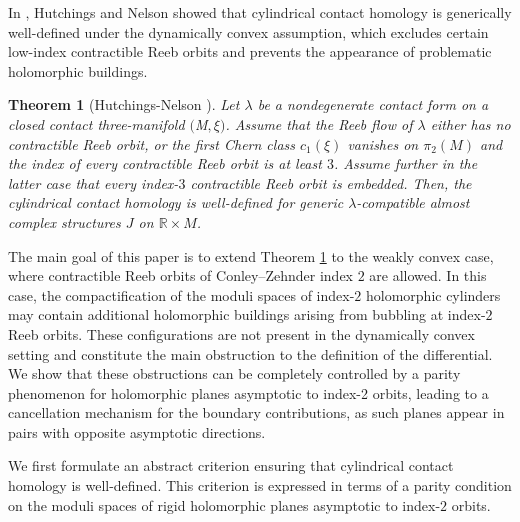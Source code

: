\documentclass{amsart}
\newcommand{\R}{\mathbb{R}}
\newtheorem{theorem}{Theorem}[section]
\begin{document}
In \cite{HN}, Hutchings and Nelson showed that cylindrical contact homology is generically well-defined under the dynamically convex
assumption, which excludes certain low-index contractible Reeb orbits
and prevents the appearance of problematic holomorphic buildings.


\begin{theorem}[Hutchings-Nelson \cite{HN}]\label{thm:HN} Let $\lambda$ be a  nondegenerate contact form on a closed contact three-manifold $($M$,\xi)$. Assume that the Reeb flow of $\lambda$ either has no contractible Reeb orbit, or the first Chern class $c_1(\xi)$ vanishes on $\pi_2(M)$ and the index of every contractible Reeb orbit is at least $3$. Assume further in the latter case that every index-$3$ contractible Reeb orbit is embedded.  
Then, the cylindrical contact homology is well-defined for generic $\lambda$-compatible almost complex structures $J$ on $\R \times M$. 
\end{theorem}


The main goal of this paper is to extend Theorem \ref{thm:HN} to the weakly convex
case, where contractible Reeb orbits of Conley–Zehnder index $2$ are allowed.
In this case, the compactification of the moduli spaces of index-$2$
holomorphic cylinders may contain additional holomorphic buildings arising
from bubbling at index-$2$ Reeb orbits. These configurations are not present
in the dynamically convex setting and constitute the main obstruction to
the definition of the differential. We show that these obstructions can be completely controlled by a parity phenomenon for holomorphic planes asymptotic to index-2 orbits, leading to a cancellation mechanism for the boundary contributions, as such planes appear in pairs with opposite asymptotic directions.

We first formulate an abstract criterion ensuring that cylindrical contact homology is well-defined.
This criterion is expressed in terms of a parity condition on the moduli
spaces of rigid holomorphic planes asymptotic to index-$2$ orbits.
\end{document}

